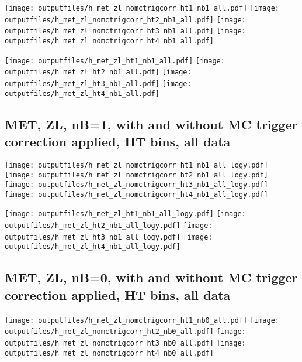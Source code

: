 \documentclass[11pt]{article}
\begin{document}
    \noindent
     \texttt{[image: outputfiles/h\_met\_zl\_nomctrigcorr\_ht1\_nb1\_all.pdf]}
     \texttt{[image: outputfiles/h\_met\_zl\_nomctrigcorr\_ht2\_nb1\_all.pdf]}
     \texttt{[image: outputfiles/h\_met\_zl\_nomctrigcorr\_ht3\_nb1\_all.pdf]}
     \texttt{[image: outputfiles/h\_met\_zl\_nomctrigcorr\_ht4\_nb1\_all.pdf]}

    \noindent
     \texttt{[image: outputfiles/h\_met\_zl\_ht1\_nb1\_all.pdf]}
     \texttt{[image: outputfiles/h\_met\_zl\_ht2\_nb1\_all.pdf]}
     \texttt{[image: outputfiles/h\_met\_zl\_ht3\_nb1\_all.pdf]}
     \texttt{[image: outputfiles/h\_met\_zl\_ht4\_nb1\_all.pdf]}

    \clearpage
     \subsection{ MET, ZL, nB=1, with and without MC trigger correction applied, HT bins, all data}

    \noindent
     \texttt{[image: outputfiles/h\_met\_zl\_nomctrigcorr\_ht1\_nb1\_all\_logy.pdf]}
     \texttt{[image: outputfiles/h\_met\_zl\_nomctrigcorr\_ht2\_nb1\_all\_logy.pdf]}
     \texttt{[image: outputfiles/h\_met\_zl\_nomctrigcorr\_ht3\_nb1\_all\_logy.pdf]}
     \texttt{[image: outputfiles/h\_met\_zl\_nomctrigcorr\_ht4\_nb1\_all\_logy.pdf]}


    \noindent
     \texttt{[image: outputfiles/h\_met\_zl\_ht1\_nb1\_all\_logy.pdf]}
     \texttt{[image: outputfiles/h\_met\_zl\_ht2\_nb1\_all\_logy.pdf]}
     \texttt{[image: outputfiles/h\_met\_zl\_ht3\_nb1\_all\_logy.pdf]}
     \texttt{[image: outputfiles/h\_met\_zl\_ht4\_nb1\_all\_logy.pdf]}


    \clearpage
     \subsection{ MET, ZL, nB=0, with and without MC trigger correction applied, HT bins, all data}

    \noindent
     \texttt{[image: outputfiles/h\_met\_zl\_nomctrigcorr\_ht1\_nb0\_all.pdf]}
     \texttt{[image: outputfiles/h\_met\_zl\_nomctrigcorr\_ht2\_nb0\_all.pdf]}
     \texttt{[image: outputfiles/h\_met\_zl\_nomctrigcorr\_ht3\_nb0\_all.pdf]}
     \texttt{[image: outputfiles/h\_met\_zl\_nomctrigcorr\_ht4\_nb0\_all.pdf]}
\end{document}
